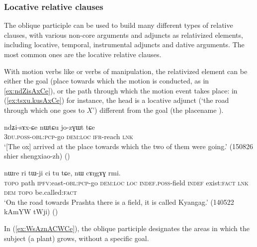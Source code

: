 \subsubsection{Locative relative clauses} \label{sec:locative.participle.relatives}
The oblique participle can be used to build many different types of relative clauses, with various non-core arguments and adjuncts as relativized elements, including locative, temporal, instrumental adjuncts and dative arguments. The most common ones are the locative relative clauses.

With  motion verbs like  or verbs of manipulation, the relativized element can be either the goal (place towards which the motion is conducted, as in \ref{ex:ndZisAxCe}), or the path through which the motion event takes place: in (\ref{ex:tsxu.kusAxCe}) for instance, the head  is a locative adjunct (`the road through which one goes to $X$') different from the goal (the placename ).

\begin{exe}
\ex \label{ex:ndZisAxCe}
\gll ndʑi-sɤx-ɕe nɯtɕu jo-zɣɯt tɕe \\
\textsc{3du}.\textsc{poss}-\textsc{obl}:\textsc{pcp}-go \textsc{dem}:\textsc{loc} \textsc{ifr}-reach \textsc{lnk} \\
\glt  `[The ox] arrived at the place towards which the two of them were going.' (150826 shier shengxiao-zh) ()
\end{exe}

\begin{exe}
\ex \label{ex:tsxu.kusAxCe}
 nɯre ri tɯ-ji ci tu tɕe, nɯ cɤŋgɤɣ rmi. \\
\textsc{topo} path \textsc{ipfv}:east-\textsc{obl}:\textsc{pcp}-go \textsc{dem}:\textsc{loc} \textsc{loc} \textsc{indef}.\textsc{poss}-field \textsc{indef} exist:\textsc{fact} \textsc{lnk} \textsc{dem}  \textsc{topo} be.called:\textsc{fact} \\
\glt  `On the road towards Prashta there is a field, it is called Kyangag.' (140522 kAmYW tWji) 	()
\end{exe}

In (\ref{ex:WsAznACWCe}), the oblique participle designates the areas in which the subject (a plant) grows, without a specific goal.

